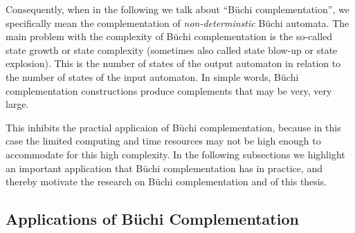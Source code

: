 Consequently, when in the following we talk about ``Büchi complementation'', we specifically mean the complementation of \textit{non-determinstic} Büchi automata. The main problem with the complexity of Büchi complementation is the so-called state growth or state complexity (sometimes also called state blow-up or state explosion). This is the number of states of the output automaton in relation to the number of states of the input automaton. In simple words, Büchi complementation constructions produce complements that may be very, very large.

This inhibits the practial applicaion of Büchi complementation, because in this case the limited computing and time resources may not be high enough to accommodate for this high complexity. In the following subsections we highlight an important application that Büchi complementation has in practice, and thereby motivate the research on Büchi complementation and of this thesis.



\subsection{Applications of Büchi Complementation}

